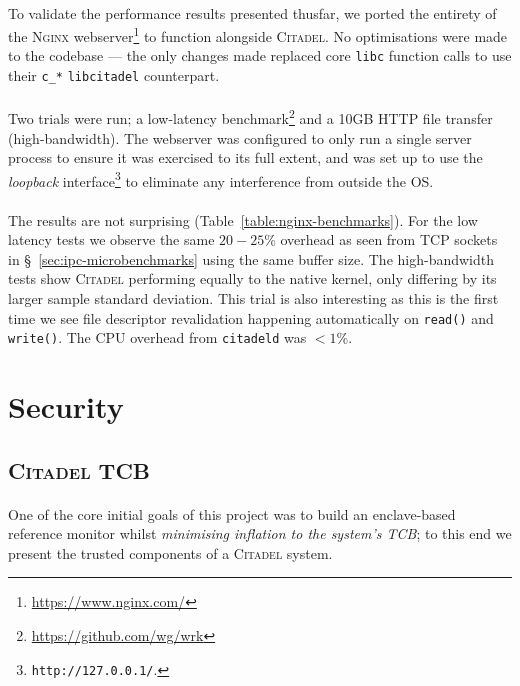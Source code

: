 \paragraph{} To validate the performance results presented thusfar, we ported the entirety of the \textsc{Nginx} webserver\footnote{\url{https://www.nginx.com/}} to function alongside \textsc{Citadel}. No optimisations were made to the codebase --- the only changes made replaced core \texttt{libc} function calls to use their \texttt{c\_*} \texttt{libcitadel} counterpart.

\paragraph{} Two trials were run; a low-latency benchmark\footnote{\url{https://github.com/wg/wrk}} and a 10GB HTTP file transfer (high-bandwidth). The webserver was configured to only run a single server process to ensure it was exercised to its full extent, and was set up to use the \textit{loopback} interface\footnote{\texttt{http://127.0.0.1/}.} to eliminate any interference from outside the OS. 

\paragraph{} The results are not surprising (Table~\ref{table:nginx-benchmarks}). For the low latency tests we observe the same $20-25$\% overhead as seen from TCP sockets in §~\ref{sec:ipc-microbenchmarks} using the same buffer size. The high-bandwidth tests show \textsc{Citadel} performing equally to the native kernel, only differing by its larger sample standard deviation. This trial is also interesting as this is the first time we see file descriptor revalidation happening automatically on \texttt{read()} and \texttt{write()}. The CPU overhead from \texttt{citadeld} was $<1\%$.





\section{Security}

\subsection{\textsc{Citadel} TCB}
\label{sec:citadel-tcb}

\paragraph{} One of the core initial goals of this project was to build an enclave-based reference monitor whilst \textit{minimising inflation to the system's TCB}; to this end we present the trusted components of a \textsc{Citadel} system.

